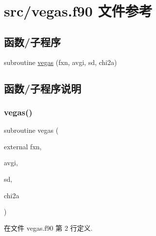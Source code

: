 \hypertarget{vegas_8f90}{}\section{src/vegas.f90 文件参考}
\label{vegas_8f90}
\subsection*{函数/子程序}
\begin{DoxyCompactItemize}
\item 
subroutine \mbox{\hyperlink{vegas_8f90_acf6484cb4cfb6306e26cd7d0adef51a3}{vegas}} (fxn, avgi, sd, chi2a)
\end{DoxyCompactItemize}


\subsection{函数/子程序说明}
\mbox{\label{vegas_8f90_acf6484cb4cfb6306e26cd7d0adef51a3}} 
\subsubsection{\texorpdfstring{vegas()}{vegas()}}
{\footnotesize\ttfamily subroutine vegas (\begin{DoxyParamCaption}\item[{external}]{fxn,  }\item[{}]{avgi,  }\item[{}]{sd,  }\item[{}]{chi2a }\end{DoxyParamCaption})}



在文件 vegas.\+f90 第 2 行定义.

